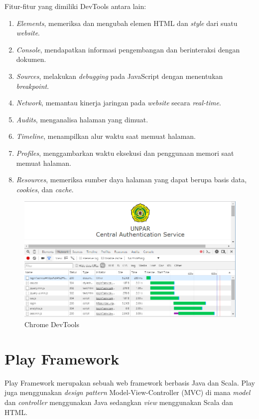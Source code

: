 Fitur-fitur yang dimiliki DevTools antara lain:
\begin{enumerate}
	\item \textit{Elements}, memeriksa dan mengubah elemen HTML dan \textit{style} dari suatu \textit{website}.
	\item \textit{Console}, mendapatkan informasi pengembangan dan berinteraksi dengan dokumen.
	\item \textit{Sources}, melakukan \textit{debugging} pada JavaScript dengan menentukan \textit{breakpoint}.
	\item \textit{Network}, memantau kinerja jaringan pada \textit{website} secara \textit{real-time}.
	\item \textit{Audits}, menganalisa halaman yang dimuat.
	\item \textit{Timeline}, menampilkan alur waktu saat memuat halaman.
	\item \textit{Profiles}, menggambarkan waktu eksekusi dan penggunaan memori saat memuat halaman.
	\item \textit{Resources}, memeriksa sumber daya halaman yang dapat berupa basis data, \textit{cookies}, dan \textit{cache}.
\end{enumerate}

\begin{figure}[H]
	\centering
	\includegraphics[scale=0.5]{Gambar/chrome-devtools}
	\caption{Chrome DevTools} 
	\label{fig:chrome_devtools}
\end{figure}



\section{Play Framework}
\label{sec:play}

Play Framework \cite{Leroux:2014} merupakan sebuah web framework berbasis Java dan Scala. Play juga menggunakan \textit{design pattern} Model-View-Controller (MVC) di mana \textit{model} dan \textit{controller} menggunakan Java sedangkan \textit{view} menggunakan Scala dan HTML. 
